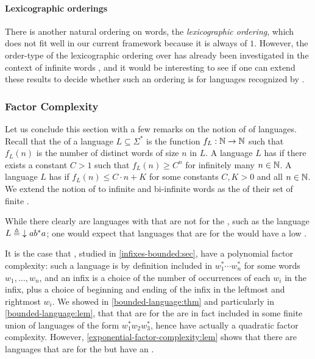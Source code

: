 \paragraph*{Lexicographic orderings} There is another natural ordering on
words, the \emph{lexicographic ordering}, which does not fit well in our
current framework because it is always of  $1$. However, the
order-type of the lexicographic ordering over  has
already been investigated in the context of infinite words \cite{CACOPU18}, and
it would be interesting to see if one can extend these results to decide
whether such an ordering is  for languages recognized by
.


\subsubsection{Factor Complexity}

\AP Let us conclude this section with a few remarks on the notion of  of languages. Recall that the  of a
language $L \subseteq \Sigma^*$ is the function $f_L: \mathbb{N} \to \mathbb{N}$ such that
$f_L(n)$ is the number of distinct words of size $n$ in $L$. A language $L$ has
 if there exists a constant $C > 1$ such
that $f_L(n) \geq C^n$ for infinitely many $n \in \mathbb{N}$. A language $L$ has
 if $f_L(n) \leq C \cdot n + K$ for some
constants $C, K > 0$ and all $n \in \mathbb{N}$.
We extend the notion of  to infinite and bi-infinite words
as the  of their set of finite .

While there clearly are languages with  that are
not  for the , such as 
the language $L \defined \dwset{ a b^* a }$;
one would expect that languages that are  for the
 would have a low .

\AP It is the case that , studied in
\cref{infixes-bounded:sec}, have a polynomial factor complexity: such a
language is by definition included in $w_1^* \cdots w_n^*$ for some words $w_1,
\dots, w_n$, and an infix is a choice of the number of occurrences of each
$w_i$ in the infix, plus a choice of beginning and ending of the infix in the
leftmost and rightmost $w_i$. We showed in \cref{bounded-language:thm} and
particularly in \cref{bounded-language:lem}, that  that
are  for the  are in fact included in
some finite union of languages of the form $w_1^* w_2 w_3^*$, hence have
actually a quadratic factor complexity. However,
\cref{exponential-factor-complexity:lem} shows that there are
 languages that are  for the
 but have an .


